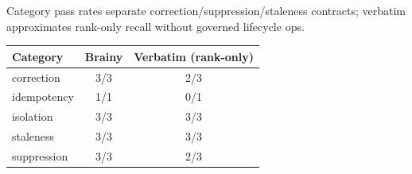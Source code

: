 Category pass rates separate correction/suppression/staleness contracts;
verbatim approximates rank-only recall without governed lifecycle ops.
\begin{table}[h]
\centering
\begin{tabular}{lcc}
\toprule
Category & Brainy & Verbatim (rank-only) \\
\midrule
correction & 3/3 & 2/3 \\
idempotency & 1/1 & 0/1 \\
isolation & 3/3 & 3/3 \\
staleness & 3/3 & 3/3 \\
suppression & 3/3 & 2/3 \\
\bottomrule
\end{tabular}
\end{table}
